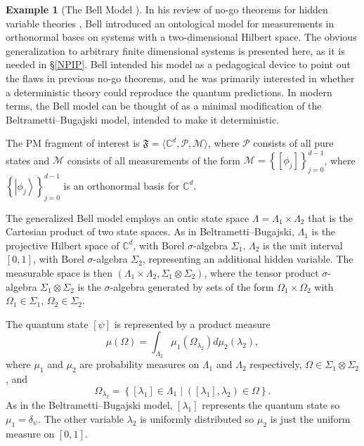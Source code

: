 \documentclass[DIV=calc,fontsize=12pt]{scrartcl} %
\theoremstyle{definition}
\newtheorem{example}[definition]{Example}
\theoremstyle{plain}
\newcommand{\Ket}[1]{\ensuremath{\left \vert #1 \right \rangle}}
\newcommand{\Proj}[1]{\ensuremath{\left [ #1 \right ]}}
\begin{document}
\begin{example}[The Bell Model \cite{Bell1966}]
\label{exa:EOM:Bell}
In his review of no-go theorems for hidden variable theories
\cite{Bell1966}, Bell introduced an ontological model for
measurements in orthonormal bases on systems with a two-dimensional
Hilbert space.  The obvious generalization to arbitrary finite
dimensional systems is presented here, as it is needed in
\S\ref{NPIP}.  Bell intended his model as a pedagogical device to
point out the flaws in previous no-go theorems, and he was primarily
interested in whether a deterministic theory could reproduce the
quantum predictions.  In modern terms, the Bell model can be thought
of as a minimal modification of the Beltrametti--Bugajski model,
intended to make it deterministic.

The PM fragment of interest is $\mathfrak{F} = \langle \mathbb{C}^d,
\mathcal{P}, \mathcal{M} \rangle$, where $\mathcal{P}$ consists of
all pure states and $\mathcal{M}$ consists of all measurements of
the form $\mathcal{M} = \left \{ \Proj{\phi_j} \right \}_{j=0}^{d-1}$,
where $\left \{ \Ket{\phi_j} \right \}_{j=0}^{d-1}$ is an orthonormal
basis for $\mathbb{C}^d$.

The generalized Bell model employs an ontic state space $\Lambda =
\Lambda_1 \times \Lambda_2$ that is the Cartesian product of two
state spaces.  As in Beltrametti--Bugajski, $\Lambda_1$ is the
projective Hilbert space of $\mathbb{C}^d$, with Borel
$\sigma$-algebra $\Sigma_1$.  $\Lambda_2$ is the unit interval
$[0,1]$, with Borel $\sigma$-algebra $\Sigma_2$, representing an
additional hidden variable.  The measurable space is then
$(\Lambda_1 \times \Lambda_2, \Sigma_1 \otimes \Sigma_2)$, where the
tensor product $\sigma$-algebra $\Sigma_1 \otimes \Sigma_2$ is the
$\sigma$-algebra generated by sets of the form $\Omega_1 \times
\Omega_2$ with $\Omega_1 \in \Sigma_1$, $\Omega_2 \in \Sigma_2$.

The quantum state $\Proj{\psi}$ is represented by a product measure
\begin{equation}
\mu(\Omega) = \int_{\Lambda_2} \mu_1(\Omega_{\lambda_2})
d\mu_2(\lambda_2),
\end{equation}
where $\mu_1$ and $\mu_2$ are probability measures on $\Lambda_1$
and $\Lambda_2$ respectively, $\Omega \in \Sigma_1 \otimes
\Sigma_2$, and
\begin{equation}
\Omega_{\lambda_2} = \left \{ \Proj{\lambda_1} \in
\Lambda_1 \middle | \left ( \Proj{\lambda_1}, \lambda_2 \right )
\in \Omega \right \}.
\end{equation}
As in the Beltrametti--Bugajski model, $\Proj{\lambda_1}$ represents
the quantum state so $\mu_1 = \delta_{\psi}$.  The other variable
$\lambda_2$ is uniformly distributed so $\mu_2$ is just the uniform
measure on $[0,1]$.


\end{example}
\end{document}
